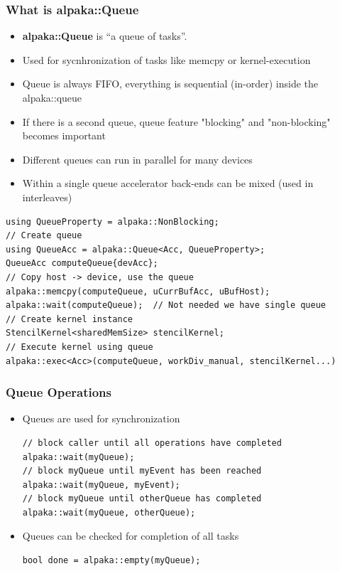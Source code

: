\documentclass[9pt]{beamer}
\begin{document}
\begin{frame} [fragile]
\frametitle{What is alpaka::Queue}
\begin{itemize}
 \item \textbf{alpaka::Queue} is “a queue of tasks”.
 \item Used for sycnhronization of tasks like memcpy or kernel-execution
 \item Queue is always FIFO, everything is sequential (in-order) inside the alpaka::queue
 \item If there is a second queue, queue feature "blocking" and "non-blocking" becomes important
 \item Different queues can run in parallel for many devices
 \item Within a single queue accelerator back-ends can be mixed (used in interleaves)
\end{itemize}
\lstset{basicstyle=\ttfamily\tiny}
\begin{lstlisting}
using QueueProperty = alpaka::NonBlocking;
// Create queue
using QueueAcc = alpaka::Queue<Acc, QueueProperty>;
QueueAcc computeQueue{devAcc};
// Copy host -> device, use the queue
alpaka::memcpy(computeQueue, uCurrBufAcc, uBufHost);
alpaka::wait(computeQueue);  // Not needed we have single queue
// Create kernel instance
StencilKernel<sharedMemSize> stencilKernel;
// Execute kernel using queue
alpaka::exec<Acc>(computeQueue, workDiv_manual, stencilKernel...)
\end{lstlisting}
\end{frame}

\begin{frame}[fragile]
\frametitle{Queue Operations}
\begin{itemize}
\item Queues are used for synchronization
\begin{lstlisting}
// block caller until all operations have completed
alpaka::wait(myQueue);
// block myQueue until myEvent has been reached
alpaka::wait(myQueue, myEvent);
// block myQueue until otherQueue has completed
alpaka::wait(myQueue, otherQueue);
\end{lstlisting}
\item Queues can be checked for completion of all tasks
\begin{lstlisting}
bool done = alpaka::empty(myQueue);
\end{lstlisting}
\end{itemize}
\end{frame}
\end{document}
